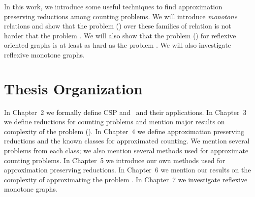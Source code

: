 In this work, we introduce some useful techniques to find approximation preserving reductions
among counting problems. We will introduce \emph{monotone} relations
and show that the problem \ccsp(\mrelset) over these families of relation is not harder that
the problem \cbis\@. We will also show that the problem \ccsp(\mrelset) for reflexive oriented graphs 
is at least as hard as the problem \cbis\@. We will also investigate reflexive monotone graphs.

\section{Thesis Organization}
In Chapter~2 we formally define CSP and \ccsp\ and their applications.
In Chapter~3 we define reductions for counting problems and mention major results
on complexity of the problem \ccsp(\mrelset). In Chapter~4 we define approximation preserving
reductions and the known classes for approximated counting. We mention several problems
from each class; we also mention several methods used for approximate counting problems.
In Chapter~5 we introduce our own methods used for approximation preserving reductions.
In Chapter~6 we mention our results on the complexity of approximating the problem \cbis\@.
In Chapter~7 we investigate reflexive monotone graphs.